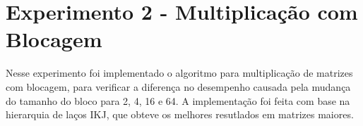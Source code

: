 \documentclass[conference]{IEEEtran}
\begin{document}
%
%
%
%

\section{Experimento 2 - Multiplicação com Blocagem}
Nesse experimento foi implementado o algoritmo para multiplicação de matrizes com blocagem, para verificar a diferença no desempenho causada pela mudança do tamanho do bloco para 2, 4, 16 e 64.
A implementação foi feita com base na hierarquia de laços IKJ, que obteve os melhores resutlados em matrizes maiores.
\end{document}
